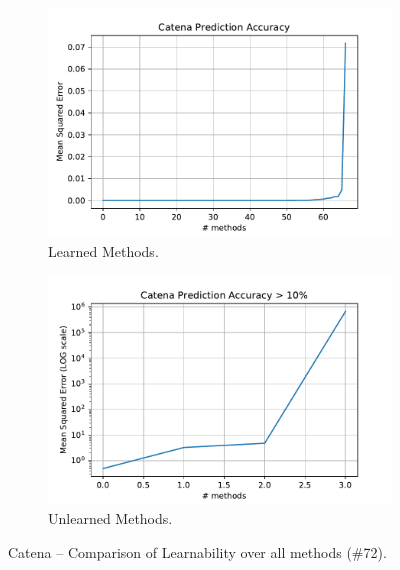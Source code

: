 \begin{figure}[h]
	\centering
	\begin{subfigure}{.5\textwidth}
	  \centering
	  \includegraphics[width=.99\linewidth]{images/Catena_plt_learnable_func_all_model_mse}
	  \caption{Learned Methods.}
	  \label{fig:catena_model_mse_lern}
	\end{subfigure}%
	\begin{subfigure}{.5\textwidth}
	  \centering
	  \includegraphics[width=.99\linewidth]{images/Catena_plt_unlearnable_func_all_model_mse_log}
	  \caption{Unlearned Methods.}
	  \label{fig:catena_model_mse_unlern}
	\end{subfigure}
	\caption{Catena -- Comparison of Learnability over all methods (\#72).}
	\label{fig:c_lernability_all_methods}
\end{figure}

